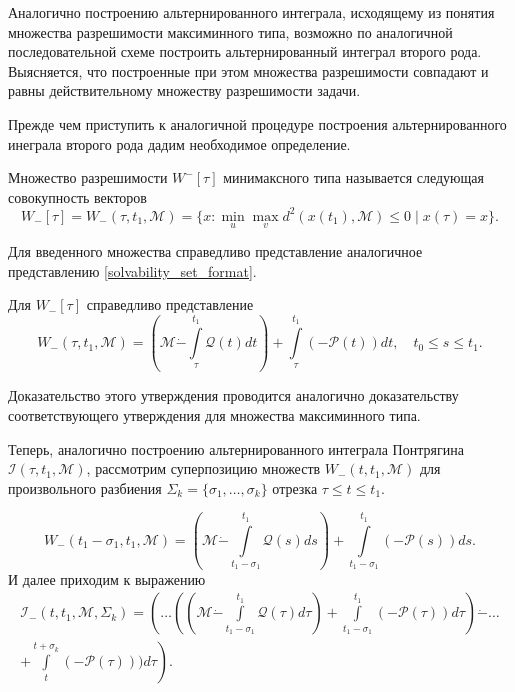 Аналогично построению альтернированного интеграла, исходящему из понятия множества разрешимости
 максиминного типа, возможно по аналогичной последовательной схеме построить альтернированный
 интеграл второго рода. Выясняется, что построенные при этом множества разрешимости совпадают
 и равны действительному множеству разрешимости задачи.

Прежде чем приступить к аналогичной процедуре построения альтернированного инеграла второго рода
дадим необходимое определение.

\begin{definition}
    Множество разрешимости \( W^-[\tau] \) минимаксного типа называется следующая совокупность
     векторов
    \begin{equation*}
        W_-[\tau] = W_-(\tau, t_1, \mathcal{M}) = \{ x : \min_u \max_v d^2(x(t_1),
         \mathcal{M}) \le 0 \mid x(\tau) = x \}.
    \end{equation*}
\end{definition}
Для введенного множества справедливо представление аналогичное представлению 
 \eqref{solvability_set_format}.
\begin{statement}
    Для \( W_-[\tau] \) справедливо представление
    \begin{equation}
        W_-(\tau, t_1, \mathcal{M}) = \left( \mathcal{M} \dot{-} \int\limits_{\tau}^{t_1}
         \mathcal{Q}(t) dt \right) + \int\limits_{\tau}^{t_1} (-\mathcal{P}(t)) dt, \quad 
         t_0 \le s \le t_1.
    \end{equation}
\end{statement}
Доказательство этого утверждения проводится аналогично доказательству соответствующего утверждения для
 множества максиминного типа.

Теперь, аналогично построению альтернированного интеграла Понтрягина \( \mathcal{I}(\tau, t_1,
 \mathcal{M}) \), рассмотрим суперпозицию множеств \( W_-(t, t_1, \mathcal{M}) \) для произвольного
 разбиения \( \Sigma_k = \{ \sigma_1, \dots, \sigma_k\} \) отрезка \( \tau \le t \le t_1 \).

\begin{equation*}
    W_-(t_1 - \sigma_1, t_1, \mathcal{M}) = \left( \mathcal{M} \dot{-} \int\limits_{t_1 - 
     \sigma_1}^{t_1} \mathcal{Q}(s) ds \right) + \int\limits_{t_1 - \sigma_1}^{t_1} (-\mathcal{P}(s))ds.
\end{equation*}
И далее приходим к выражению
\begin{multline}\label{}
    \mathcal{I}_-(t, t_1, \mathcal{M}, \Sigma_k) = \left(\dots\left(\left(\mathcal{M} \dot{-}
     \int\limits_{t_1 - \sigma_1}^{t_1} \mathcal{Q}(\tau) d\tau \right) + \int\limits_{t_1 - 
     \sigma_1}^{t_1}(-\mathcal{P}(\tau)) d\tau \right) \dot{-} \dots \right. \\
    \left. + \int\limits_{t}^{t + \sigma_k} (-\mathcal{P}(\tau))) d\tau \right) .
\end{multline}

